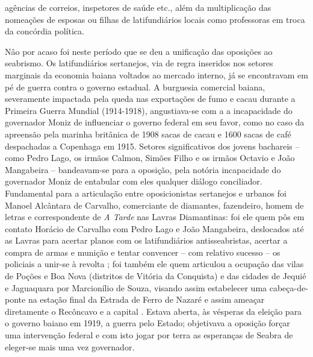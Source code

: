 agências de correios, inspetores de saúde etc., além da multiplicação das nomeações de esposas ou filhas de latifundiários locais como professoras em troca da concórdia política.

Nâo por acaso foi neste período que se deu a unificação das oposições ao seabrismo. Os latifundiários sertanejos, via de regra inseridos nos setores marginais da economia baiana voltados ao mercado interno, já se encontravam em pé de guerra contra o governo estadual. A burguesia comercial baiana, severamente impactada pela queda nas exportações de fumo e cacau durante a Primeira Guerra Mundial (1914-1918), angustiava-se com a a incapacidade do governador Moniz de influenciar o governo federal em seu favor, como no caso da apreensão pela marinha britânica de 1908 sacas de cacau e 1600 sacas de café despachadas a Copenhaga em 1915. Setores significativos dos jovens bachareis -- como Pedro Lago, os irmãos Calmon, Simões Filho e os irmãos Octavio e João Mangabeira -- bandeavam-se para a oposição, pela notória incapacidade do governador Moniz de entabular com eles qualquer diálogo conciliador. Fundamental para a articulação entre oposicionistas sertanejos e urbanos foi Manoel Alcântara de Carvalho, comerciante de diamantes, fazendeiro, homem de letras e correspondente de \textit{A Tarde} nas Lavras Diamantinas: foi ele quem pôs em contato Horácio de Carvalho com Pedro Lago e João Mangabeira, deslocados até as Lavras para acertar planos com os latifundiários antisseabristas, acertar a compra de armas e munição e tentar convencer -- com relativo sucesso -- os policiais a unir-se à revolta \cite[p.~201]{CUNHA2011}; foi também ele quem articulou a ocupação das vilas de Poções e Boa Nova (distritos de Vitória da Conquista) e das cidades de Jequié e Jaguaquara por Marcionílio de Souza, visando assim estabelecer uma cabeça-de-ponte na estação final da Estrada de Ferro de Nazaré e assim ameaçar diretamente o Recôncavo e a capital \cite[p.~202]{CUNHA2011}. Estava aberta, às vésperas da eleição para o governo baiano em 1919, a guerra pelo Estado; objetivava a oposição forçar uma intervenção federal e com isto jogar por terra as esperanças de Seabra de eleger-se mais uma vez governador.

